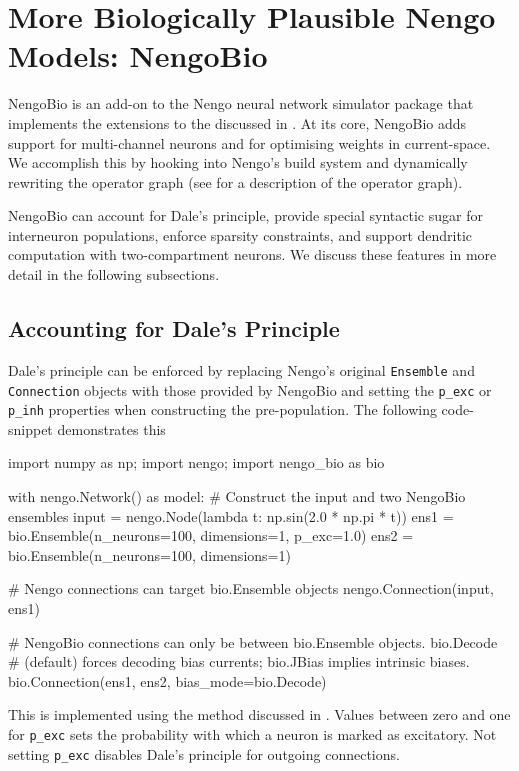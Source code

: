 
\section{More Biologically Plausible Nengo Models: NengoBio}
\label{app:nengo_bio}

NengoBio is an add-on to the Nengo neural network simulator package \citep{bekolay2014nengo} that implements the extensions to the \NEF discussed in .
At its core, NengoBio adds support for multi-channel neurons and for optimising weights in current-space.
We accomplish this by hooking into Nengo's build system and dynamically rewriting the operator graph (see \cite{gosmann2017automatic} for a description of the operator graph).

NengoBio can account for Dale's principle, provide special syntactic sugar for interneuron populations, enforce sparsity constraints, and support dendritic computation with two-compartment \LIF neurons.
We discuss these features in more detail in the following subsections.

\subsection{Accounting for Dale's Principle}

Dale's principle can be enforced by replacing Nengo's original \texttt{Ensemble} and \texttt{Connection} objects with those provided by NengoBio and setting the \texttt{p\_exc} or \texttt{p\_inh} properties when constructing the pre-population.
The following code-snippet demonstrates this
\begin{pythoncode}
import numpy as np; import nengo; import nengo_bio as bio

with nengo.Network() as model:
	# Construct the input and two NengoBio ensembles
    input = nengo.Node(lambda t: np.sin(2.0 * np.pi * t))
    ens1 = bio.Ensemble(n_neurons=100, dimensions=1, p_exc=1.0)
    ens2 = bio.Ensemble(n_neurons=100, dimensions=1)

	# Nengo connections can target bio.Ensemble objects
    nengo.Connection(input, ens1)

	# NengoBio connections can only be between bio.Ensemble objects. bio.Decode
	# (default) forces decoding bias currents; bio.JBias implies intrinsic biases.
    bio.Connection(ens1, ens2, bias_mode=bio.Decode)
\end{pythoncode}
This is implemented using the \NNLS method discussed in .
Values between zero and one for \texttt{p\_exc} sets the probability with which a neuron is marked as excitatory.
Not setting \texttt{p\_exc} disables Dale's principle for outgoing connections.

